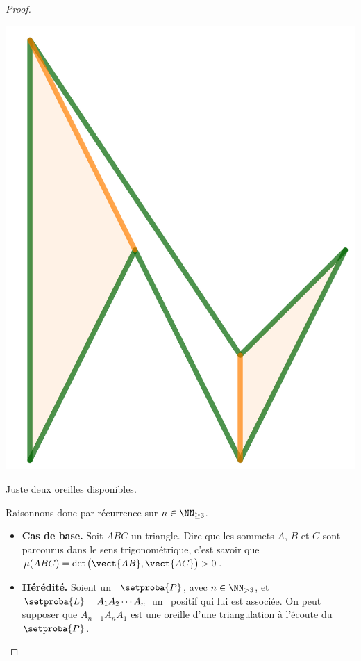 \begin{proof}
\begin{multicols}{2}
    	\begin{center}
        	\includegraphics[scale=.4]{content/polygon/at-least-one/mini-ear-2.png}

        	\smallskip
       		Juste deux oreilles disponibles.
    	\end{center}
    \end{multicols}


	Raisonnons donc par récurrence sur $n \in \NN_{\geq3}$.

	\begin{itemize}
		\item \textbf{Cas de base.}
		Soit $ABC$ un triangle. Dire que les sommets $A$, $B$ et $C$ sont parcourus dans le sens trigonométrique, c'est savoir que $\mu(ABC) = \det \big( \vect{AB} , \vect{AC} \big) > 0$.


		\item \textbf{Hérédité.}
		Soient un \ngone\ $\setproba{P}$, avec $n \in \NN_{>3}$, et $\setproba{L} = A_1 A_2 \cdots A_n$ un \ncycle\ positif qui lui est associée. On peut supposer que $A_{n-1} A_n A_1$ est une oreille d'une triangulation à l'écoute du \ngone\ $\setproba{P}$.



\end{itemize}
\end{proof}
